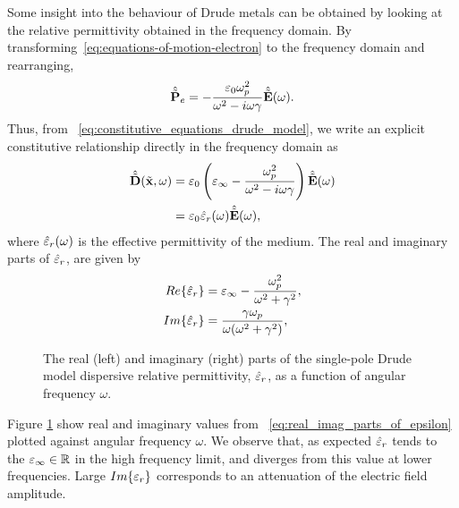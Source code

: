Some insight into the behaviour of Drude metals can be obtained by looking at
the relative permittivity obtained in the frequency domain.
By transforming~\eqref{eq:equations-of-motion-electron} to the frequency
domain and rearranging,
\begin{equation}
  \hat{\tilde{\mathbf{P}}}_e = - \frac{\varepsilon_0 \omega_p^2}{\omega^2 - i \omega \gamma } \hat{\tilde{\mathbf{E}}}(\omega) .
  \label{eq:polarisation-field-freq-domain}
\end{equation}
Thus, from ~\eqref{eq:constitutive_equations_drude_model}, we 
write an explicit constitutive relationship directly in the frequency domain as
\begin{equation}
  \begin{split}
    \hat{\tilde{\mathbf{D}}}(\tilde{\mathbf{x}},\omega) &= \varepsilon_0 \left( \varepsilon_{\infty} - \frac{\omega_p^2 }{\omega^2 - i \omega \gamma } \right) \hat{\tilde{\mathbf{E}}}(\omega) \\
    &= \varepsilon_0 \hat{\varepsilon}_r (\omega) \hat{\tilde{\mathbf{E}}}(\omega) ,
  \end{split}
\end{equation}
where $\hat{\varepsilon}_r(\omega)$ is the effective permittivity of the medium. The real and imaginary
parts of $\hat{\varepsilon}_r$, are given by
\begin{subequations}
  \begin{align}
    \label{eq:real_imag_parts_of_epsilon}
    Re\{ \hat{\varepsilon}_r \} &= \varepsilon_{\infty} - \frac{\omega_p^2}{\omega^2 + \gamma^2}, \\
    Im\{ \hat{\varepsilon}_r \} &= \frac{\gamma \omega_p}{\omega ( \omega^2 + \gamma^2) } ,
  \end{align}
\end{subequations}

\begin{figure}[htbp!]
  \label{fig:read-and-imag-effective-permittivity}
  \caption{The real (left) and imaginary (right) parts of the single-pole
    Drude model dispersive relative permittivity, $\hat{\varepsilon}_r$, as a function
    of angular frequency $\omega$.}
\end{figure}
Figure \ref{fig:read-and-imag-effective-permittivity} show real and imaginary
values from ~\eqref{eq:real_imag_parts_of_epsilon} plotted
against angular frequency $\omega$. We observe
that, as expected $\hat{\varepsilon}_r$ tends to the $\varepsilon_{\infty} \in \mathbb{R}$ in the high frequency limit,
and diverges from this value at lower frequencies.
Large $Im\{\varepsilon_r\}$ corresponds to an attenuation of the electric field amplitude.

